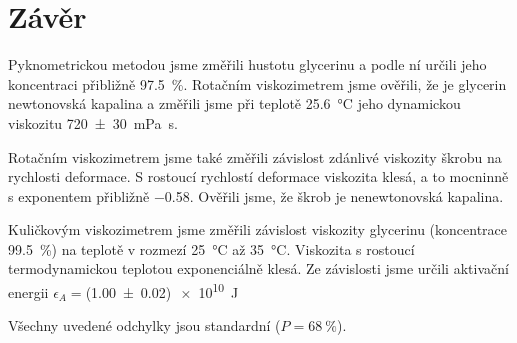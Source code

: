 \section*{Závěr}
Pyknometrickou metodou jsme změřili hustotu glycerinu a podle ní určili jeho koncentraci přibližně \SI{97.5}{\percent}.
Rotačním viskozimetrem jsme ověřili, že je glycerin newtonovská kapalina a změřili jsme při teplotě \SI{25.6}{\degreeCelsius} jeho dynamickou viskozitu \SI{720(30)}{\milli\pascal\s}.

Rotačním viskozimetrem jsme také změřili závislost zdánlivé viskozity škrobu na rychlosti deformace.
S rostoucí rychlostí deformace viskozita klesá, a to mocninně s exponentem přibližně \num{-0.58}.
Ověřili jsme, že škrob je nenewtonovská kapalina.

Kuličkovým viskozimetrem jsme změřili závislost viskozity glycerinu (koncentrace \SI{99.5}{\percent}) na teplotě v rozmezí \SI{25}{\degreeCelsius} až \SI{35}{\degreeCelsius}.
Viskozita s rostoucí termodynamickou teplotou exponenciálně klesá.
Ze závislosti jsme určili aktivační energii $\epsilon_A = $(\num{1.00(2)})\,\SI{e10}{\joule} 

Všechny uvedené odchylky jsou standardní ($P=\SI{68}{\percent}$).